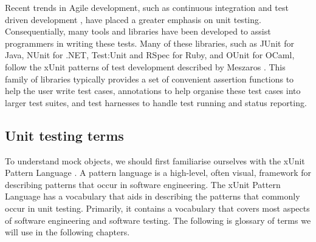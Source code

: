 Recent trends in Agile development, such as continuous integration
\cite{humble:continuous} and test driven development \cite{beck:tdd},
have placed a greater emphasis on unit testing. Consequentially, many
tools and libraries have been developed to assist programmers in
writing these tests. Many of these libraries, such as JUnit
\cite{www:junit} for Java, NUnit \cite{www:nunit} for .NET, Test:Unit
\cite{www:ruby:unit} and RSpec \cite{www:rspec} for Ruby, and OUnit
\cite{www:ounit} for OCaml, follow the xUnit patterns of test
development described by Meszaros \cite{meszaros:xunit}. This family
of libraries typically provides a set of convenient assertion
functions to help the user write test cases, annotations to help
organise these test cases into larger test suites, and test harnesses
to handle test running and status reporting.

\subsection{Unit testing terms}



To understand mock objects, we should first familiarise ourselves with
the xUnit Pattern Language \cite{meszaros:xunit}. A pattern language
is a high-level, often visual, framework for describing patterns that
occur in software engineering. The xUnit Pattern Language has a
vocabulary that aids in describing the patterns that commonly occur
in unit testing. Primarily, it contains a vocabulary that covers most
aspects of software engineering and software testing. The following is
glossary of terms we will use in the following chapters.

